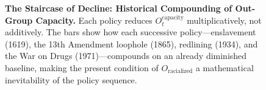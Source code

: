 \documentclass[12pt,openany]{book}
\begin{document}
\begin{figure}[htbp]
\caption{\textbf{The Staircase of Decline: Historical Compounding of Out-Group Capacity.} Each policy reduces $O_t^{\text{capacity}}$ multiplicatively, not additively. The bars show how each successive policy---enslavement (1619), the 13th Amendment loophole (1865), redlining (1934), and the War on Drugs (1971)---compounds on an already diminished baseline, making the present condition of $O_{\text{racialized}}$ a mathematical inevitability of the policy sequence.}
\label{fig:historical_compounding}
\end{figure}
\end{document}
